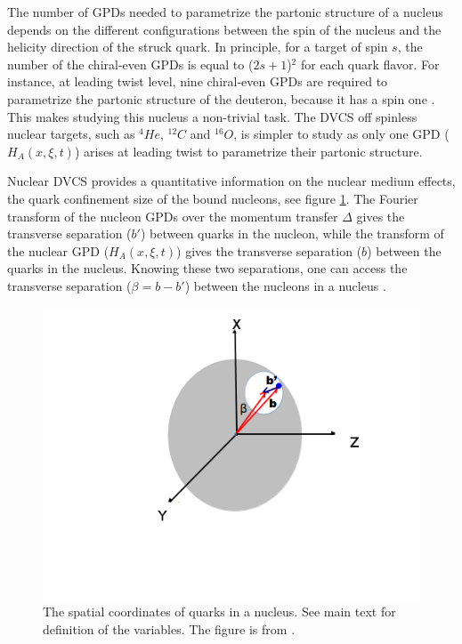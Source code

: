 The number of GPDs needed to parametrize the partonic structure of a nucleus 
depends on the different configurations between the spin of the nucleus and the 
helicity direction of the struck quark.  In principle, for a target of spin 
$s$, the number of the chiral-even GPDs is equal to ($2s+1$)$^2$ for each quark 
flavor.  For instance, at leading twist level, nine chiral-even GPDs are 
required to parametrize the partonic structure of the deuteron, because it has 
a spin one \cite{Kir, Van}.  This makes studying this nucleus a non-trivial 
task.  The DVCS off spinless nuclear targets, such as $^4He$, $^{12}C$ and 
$^{16}O$, is simpler to study as only one GPD ($H_{A}(x,\xi,t)$) arises at 
leading twist to parametrize their partonic structure.

 Nuclear DVCS provides a quantitative information on the nuclear medium 
 effects, the quark confinement size of the bound nucleons, see figure 
 \ref{fig:quarks_nucleus}. The Fourier transform of the nucleon GPDs over the 
 momentum transfer $\Delta$ gives the transverse separation ($b'$) between 
 quarks in the nucleon, while the transform of the nuclear GPD 
 ($H_{A}(x,\xi,t)$) gives the transverse separation ($b$) between the quarks in 
 the nucleus. Knowing these two separations, one can access the transverse 
 separation ($\beta = b - b'$) between the nucleons in a nucleus 
 \cite{EMC_simonetta}.
\begin{figure}[tbp]
\centering
\includegraphics[scale=0.6]{fig/quarks_nucleus.png}
\vspace{-0.7in}
\caption{The spatial coordinates of quarks in a nucleus. See main text for definition of the variables. The figure is from \cite{simonetta_pre}. } 
\label{fig:quarks_nucleus}
\end{figure}

